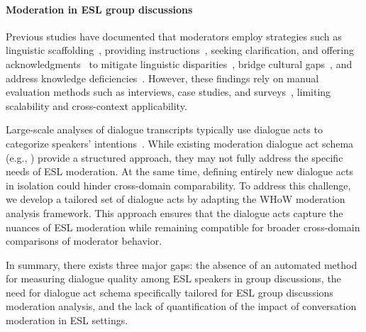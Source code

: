 \paragraph{Moderation in ESL group discussions}  


Previous studies have documented that moderators employ strategies such as linguistic scaffolding~\citep{kayi2013scaffolding, gagne2013cooperative}, providing instructions~\citep{hamzah2016effect}, seeking clarification, and offering acknowledgments~\citep{braham2009acknowledgement} to mitigate linguistic disparities~\citep{jones1999silence}, bridge cultural gaps~\citep{osman2007interaction}, and address knowledge deficiencies~\citep{asterhan2010online, vasodavan2020moderation}. However, these findings rely on manual evaluation methods such as interviews, case studies, and surveys~\citep{osman2007interaction, hew2008attracting, hamzah2016effect, kayi2013scaffolding}, limiting scalability and cross-context applicability.

Large-scale analyses of dialogue transcripts typically use dialogue acts to categorize speakers' intentions~\citep{d1985speech}. While existing moderation dialogue act schema (e.g., \citet{park2012facilitative}) provide a structured approach, they may not fully address the specific needs of ESL moderation. At the same time, defining entirely new dialogue acts in isolation could hinder cross-domain comparability. To address this challenge, we develop a tailored set of dialogue acts by adapting the WHoW moderation analysis framework. This approach ensures that the dialogue acts capture the nuances of ESL moderation while remaining compatible for broader cross-domain comparisons of moderator behavior.


In summary, there exists three major gaps: the absence of an automated method for measuring dialogue quality among ESL speakers in group discussions, the need for dialogue act schema specifically tailored for ESL group discussions moderation analysis, and the lack of quantification of the impact of conversation moderation in ESL settings.